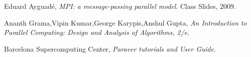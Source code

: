 \documentclass[final,a4paper,11pt]{report}
\begin{document}


\tableofcontents


\begin{thebibliography}{9}

  Eduard Ayguadé,
  \emph{MPI: a message-passing parallel model}.
  Class Slides,
  2009.

  Ananth Grama,Vipin Kumar,George Karypis,Anshul Gupta,
  \emph{An Introduction to Parallel Computing: Design and Analysis of Algorithms, 2/e}.

  Barcelona Supercomputing Center,
  \emph{Paraver tutorials and User Guide}.

\end{thebibliography}
\end{document}
